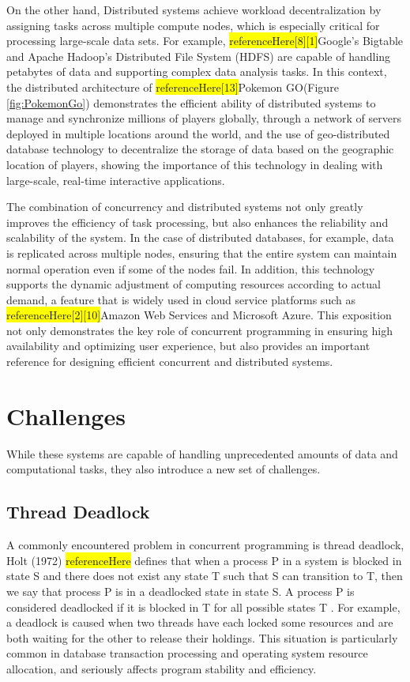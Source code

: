 \documentclass{l4proj}
\begin{document}
On the other hand, Distributed systems achieve workload decentralization by assigning tasks across multiple compute nodes, which is especially critical for processing large-scale data sets. For example, \colorbox{yellow}{referenceHere[8][1]}Google's Bigtable and Apache Hadoop's Distributed File System (HDFS) are capable of handling petabytes of data and supporting complex data analysis tasks. In this context, the distributed architecture of \colorbox{yellow}{referenceHere[13]}Pokemon GO(Figure \ref{fig:PokemonGo}) demonstrates the efficient ability of distributed systems to manage and synchronize millions of players globally, through a network of servers deployed in multiple locations around the world, and the use of geo-distributed database technology to decentralize the storage of data based on the geographic location of players, showing the importance of this technology in dealing with large-scale, real-time interactive applications.
		
The combination of concurrency and distributed systems not only greatly improves the efficiency of task processing, but also enhances the reliability and scalability of the system. In the case of distributed databases, for example, data is replicated across multiple nodes, ensuring that the entire system can maintain normal operation even if some of the nodes fail. In addition, this technology supports the dynamic adjustment of computing resources according to actual demand, a feature that is widely used in cloud service platforms such as \colorbox{yellow}{referenceHere[2][10]}Amazon Web Services and Microsoft Azure. This exposition not only demonstrates the key role of concurrent programming in ensuring high availability and optimizing user experience, but also provides an important reference for designing efficient concurrent and distributed systems.

\section{Challenges}

While these systems are capable of handling unprecedented amounts of data and computational tasks, they also introduce a new set of challenges. 

\subsection{Thread Deadlock}

A commonly encountered problem in concurrent programming is thread deadlock, Holt (1972) \colorbox{yellow}{referenceHere} defines that when a process P in a system is blocked in state S and there does not exist any state T such that S can transition to T, then we say that process P is in a deadlocked state in state S. A process P is considered deadlocked if it is blocked in T for all possible states T . For example, a deadlock is caused when two threads have each locked some resources and are both waiting for the other to release their holdings. This situation is particularly common in database transaction processing and operating system resource allocation, and seriously affects program stability and efficiency.
\end{document}
